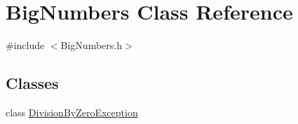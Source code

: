 \hypertarget{class_big_numbers}{}\section{Big\+Numbers Class Reference}
\label{class_big_numbers}


{\ttfamily \#include $<$Big\+Numbers.\+h$>$}

\subsection*{Classes}
\begin{DoxyCompactItemize}
\item 
class \mbox{\hyperlink{class_big_numbers_1_1_division_by_zero_exception}{Division\+By\+Zero\+Exception}}
\end{DoxyCompactItemize}
